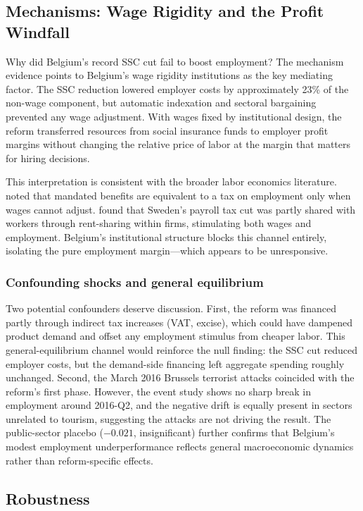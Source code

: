 \documentclass[12pt]{article}
\begin{document}
\subsection{Mechanisms: Wage Rigidity and the Profit Windfall}

Why did Belgium's record SSC cut fail to boost employment? The mechanism evidence points to Belgium's wage rigidity institutions as the key mediating factor. The SSC reduction lowered employer costs by approximately 23\% of the non-wage component, but automatic indexation and sectoral bargaining prevented any wage adjustment. With wages fixed by institutional design, the reform transferred resources from social insurance funds to employer profit margins without changing the relative price of labor at the margin that matters for hiring decisions.

This interpretation is consistent with the broader labor economics literature. \citet{summers1989} noted that mandated benefits are equivalent to a tax on employment only when wages cannot adjust. \citet{saezetal2019} found that Sweden's payroll tax cut was partly shared with workers through rent-sharing within firms, stimulating both wages and employment. Belgium's institutional structure blocks this channel entirely, isolating the pure employment margin---which appears to be unresponsive.

\subsubsection*{Confounding shocks and general equilibrium} Two potential confounders deserve discussion. First, the reform was financed partly through indirect tax increases (VAT, excise), which could have dampened product demand and offset any employment stimulus from cheaper labor. This general-equilibrium channel would reinforce the null finding: the SSC cut reduced employer costs, but the demand-side financing left aggregate spending roughly unchanged. Second, the March 2016 Brussels terrorist attacks coincided with the reform's first phase. However, the event study shows no sharp break in employment around 2016-Q2, and the negative drift is equally present in sectors unrelated to tourism, suggesting the attacks are not driving the result. The public-sector placebo ($-0.021$, insignificant) further confirms that Belgium's modest employment underperformance reflects general macroeconomic dynamics rather than reform-specific effects.

\subsection{Robustness}
\end{document}
